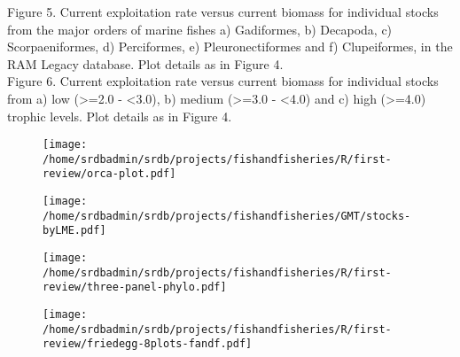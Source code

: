 \documentclass[letterpaper,12pt]{article}
\begin{document}
\noindent Figure 5.  Current exploitation rate versus current biomass for individual stocks from the major orders of marine fishes a) Gadiformes, b) Decapoda, c) Scorpaeniformes, d) Perciformes, e) Pleuronectiformes and f) Clupeiformes, in the RAM Legacy database. Plot details as in Figure 4.
\\

\noindent Figure 6.  Current exploitation rate versus current biomass for individual stocks from a) low (>=2.0 - <3.0), b) medium (>=3.0 - <4.0) and c) high (>=4.0) trophic levels. Plot details as in Figure 4.


\begin{landscape}
\begin{figure}
\begin{center}
\texttt{[image: /home/srdbadmin/srdb/projects/fishandfisheries/R/first-review/orca-plot.pdf]}
\end{center}
\caption{ }\label{fig:orca}
\end{figure}
\end{landscape}

\begin{landscape}
\begin{figure}
\begin{center}
\texttt{[image: /home/srdbadmin/srdb/projects/fishandfisheries/GMT/stocks-byLME.pdf]}
\end{center}
\caption{ }\label{fig:lmes}
\end{figure}
\end{landscape}


\begin{figure}
\begin{center}
\texttt{[image: /home/srdbadmin/srdb/projects/fishandfisheries/R/first-review/three-panel-phylo.pdf]} %
\end{center}
\caption{ }\label{fig:taxo:threepanel}
\end{figure}


\begin{landscape}
\begin{figure}
\begin{center}
\texttt{[image: /home/srdbadmin/srdb/projects/fishandfisheries/R/first-review/friedegg-8plots-fandf.pdf]}
\end{center}
\caption{ }\label{fig:friedegg}
\end{figure}
\end{landscape}
\end{document}

